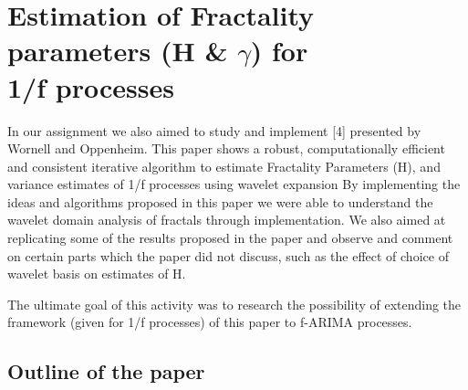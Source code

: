 \documentclass[a4paper]{article}
\begin{document}
\section{Estimation of Fractality parameters (H \& $\gamma$) for \\1/f processes}
In our assignment we also aimed to study and implement [4] presented by Wornell and Oppenheim. This paper shows a robust, computationally efficient and consistent iterative algorithm to estimate Fractality Parameters (H), ​and variance estimates of 1/f processes using wavelet expansion
By implementing the ideas and algorithms proposed in this paper we were able to understand the wavelet domain analysis of fractals through implementation. We also aimed at replicating some of the results proposed in the paper and observe and comment on certain parts which the paper did not discuss, such as the effect of choice of wavelet basis on estimates of H.

The ultimate goal of this activity was to research the possibility of extending the framework (given for 1/f processes) of this paper to f-ARIMA processes.

\subsection{Outline of the paper}



\end{document}
